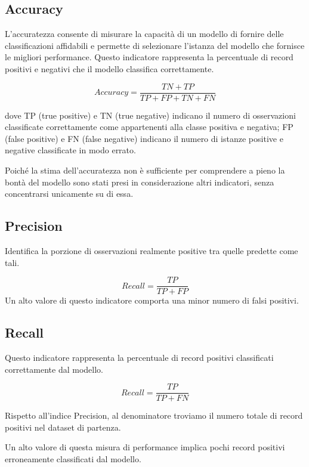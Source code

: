 \documentclass[12pt,a4paper]{report}
\begin{document}
\begin{multicols}{2}
\subsection{Accuracy}
	
	L'accuratezza consente di misurare la capacità di un modello di fornire delle classificazioni affidabili e permette di selezionare l'istanza del modello che fornisce le migliori performance. 
	Questo indicatore rappresenta la percentuale di record positivi e negativi che il modello classifica correttamente.
	
\begin{equation}
	Accuracy = \frac{TN + TP}{TP+FP+TN+FN}
\end{equation}
 
	dove TP (true positive) e TN (true negative) indicano il numero di osservazioni classificate correttamente come appartenenti alla classe positiva e negativa; FP (false positive) e FN (false negative) indicano il numero di istanze positive e negative classificate in modo errato.
	
	Poiché la stima dell'accuratezza  non è sufficiente per comprendere a pieno la bontà del modello sono stati presi in considerazione altri indicatori, senza concentrarsi unicamente su di essa. 
	
	\subsection{Precision}	 
	Identifica la porzione di osservazioni realmente positive tra quelle predette come tali.
	
	\begin{equation}
		Recall = \frac{TP}{TP+FP}
	\end{equation}
	Un alto valore di questo indicatore comporta una minor numero di falsi positivi.
	
	
\subsection{Recall}
	Questo indicatore rappresenta la percentuale di record positivi classificati correttamente dal modello.
	
	\begin{equation}
		Recall = \frac{TP}{TP+FN}
	\end{equation}

Rispetto all'indice Precision, al denominatore troviamo il numero totale di record positivi nel dataset di partenza. 

	Un alto valore di questa misura di performance implica pochi record positivi erroneamente classificati dal modello.


\end{multicols}
\end{document}
